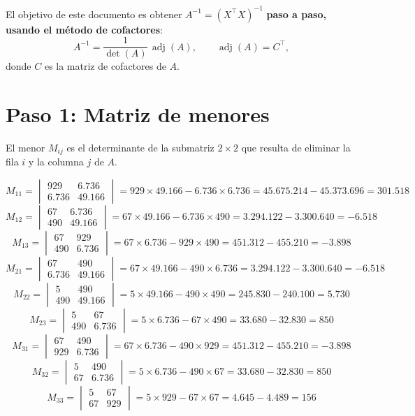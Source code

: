 \documentclass[11pt]{article}
\begin{document}
El objetivo de este documento es obtener $A^{-1}=(X^\top X)^{-1}$ \textbf{paso a paso, usando el método de cofactores}:
\[
  A^{-1} = \frac{1}{\det(A)}\,\operatorname{adj}(A),
  \qquad
  \operatorname{adj}(A) = C^\top,
\]
donde $C$ es la matriz de cofactores de $A$.

\section{Paso 1: Matriz de menores}

El menor $M_{ij}$ es el determinante de la submatriz $2\times 2$ que resulta de eliminar la fila $i$ y la columna $j$ de $A$.

\[
M_{11}=\begin{vmatrix}929 & 6.736\\ 6.736 & 49.166\end{vmatrix}
= 929\times 49.166 - 6.736\times 6.736
= 45.675.214-45.373.696=301.518
\]
\[
M_{12}=\begin{vmatrix}67 & 6.736\\ 490 & 49.166\end{vmatrix}
= 67\times 49.166 - 6.736\times 490
= 3.294.122-3.300.640=-6.518
\]
\[
M_{13}=\begin{vmatrix}67 & 929\\ 490 & 6.736\end{vmatrix}
= 67\times 6.736 - 929\times 490
= 451.312-455.210=-3.898
\]
\[
M_{21}=\begin{vmatrix}67 & 490\\ 6.736 & 49.166\end{vmatrix}
= 67\times 49.166 - 490\times 6.736
= 3.294.122-3.300.640=-6.518
\]
\[
M_{22}=\begin{vmatrix}5 & 490\\ 490 & 49.166\end{vmatrix}
= 5\times 49.166 - 490\times 490
= 245.830-240.100=5.730
\]
\[
M_{23}=\begin{vmatrix}5 & 67\\ 490 & 6.736\end{vmatrix}
= 5\times 6.736 - 67\times 490
= 33.680-32.830=850
\]
\[
M_{31}=\begin{vmatrix}67 & 490\\ 929 & 6.736\end{vmatrix}
= 67\times 6.736 - 490\times 929
= 451.312-455.210=-3.898
\]
\[
M_{32}=\begin{vmatrix}5 & 490\\ 67 & 6.736\end{vmatrix}
= 5\times 6.736 - 490\times 67
= 33.680-32.830=850
\]
\[
M_{33}=\begin{vmatrix}5 & 67\\ 67 & 929\end{vmatrix}
= 5\times 929 - 67\times 67
= 4.645-4.489=156
\]
\end{document}
